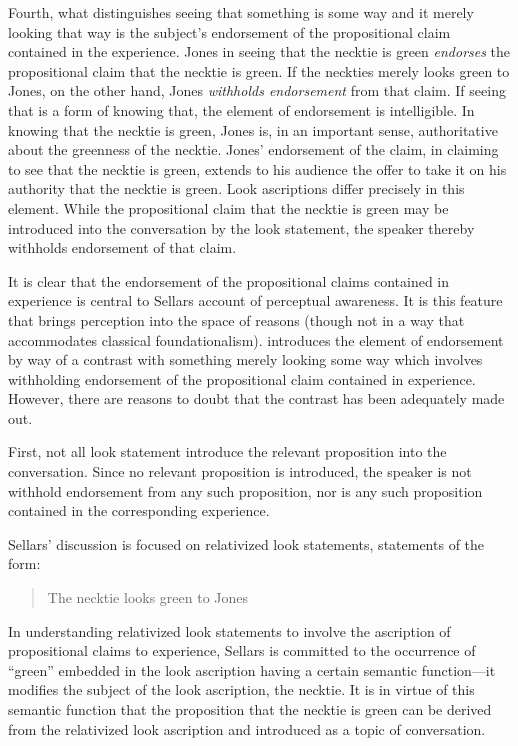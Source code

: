 \documentclass[12pt]{article}
\begin{document}
Fourth, what distinguishes seeing that something is some way and it merely looking that way is the subject's endorsement of the propositional claim contained in the experience. Jones in seeing that the necktie is green \emph{endorses} the propositional claim that the necktie is green. If the neckties merely looks green to Jones, on the other hand, Jones \emph{withholds endorsement} from that claim. If seeing that is a form of knowing that, the element of endorsement is intelligible. In knowing that the necktie is green, Jones is, in an important sense, authoritative about the greenness of the necktie. Jones' endorsement of the claim, in claiming to see that the necktie is green, extends to his audience the offer to take it on his authority that the necktie is green. Look ascriptions differ precisely in this element. While the propositional claim that the necktie is green may be introduced into the conversation by the look statement, the speaker thereby withholds endorsement of that claim. 

It is clear that the endorsement of the propositional claims contained in experience is central to Sellars account of perceptual awareness. It is this feature that brings perception into the space of reasons (though not in a way that accommodates classical foundationalism). \citet[§§16--17]{Sellars:1956xp} introduces the element of endorsement by way of a contrast with something merely looking some way which involves withholding endorsement of the propositional claim contained in experience. However, there are reasons to doubt that the contrast has been adequately made out.

First, not all look statement introduce the relevant proposition into the conversation. Since no relevant proposition is introduced, the speaker is not withhold endorsement from any such proposition, nor is any such proposition contained in the corresponding experience. 

Sellars' discussion is focused on relativized look statements, statements of the form:
\begin{quote}
    The necktie looks green to Jones
\end{quote}
In understanding relativized look statements to involve the ascription of propositional claims to experience, Sellars is committed to the occurrence of ``green'' embedded in the look ascription having a certain semantic function---it modifies the subject of the look ascription, the necktie. It is in virtue of this semantic function that the proposition that the necktie is green can be derived from the relativized look ascription and introduced as a topic of conversation. 
\end{document}
